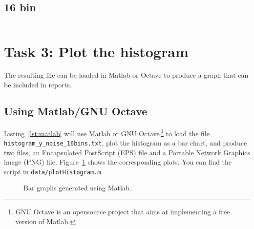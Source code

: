 \documentclass[english,a4paper,12pt,oneside]{article}
\begin{document}
\subsection*{16 bin}
\begin{center}
\begin{tabular}{cc}

\end{tabular}
\end{center}

\section*{Task 3: Plot the histogram}

The resulting file can be loaded in Matlab or Octave to produce a graph that can be included in reports. 

\subsection*{Using Matlab/GNU Octave}


Listing~\ref{lst:matlab} will use Matlab or GNU Octave\,\footnote{GNU Octave is an opensource project that aims at implementing a free version of Matlab.} to load the file \verb+histogram_y_noise_16bins.txt+, plot the histogram as a bar chart,  and produce two files, an Encapsulated PostScript (EPS) file and a Portable Network Graphics image (PNG) file.
Figure~\ref{fig:matlab} shows the corresponding plots. 
You can find the script in \verb+data/plotHistogram.m+. 

\begin{figure}[!h]
\centering
{}\hfill
{}
\caption{\label{fig:matlab}Bar graphs generated using Matlab.}
\end{figure}
\end{document}
